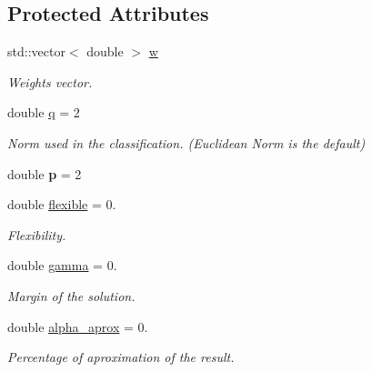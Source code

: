 \subsection*{Protected Attributes}
\begin{DoxyCompactItemize}
\item 
\mbox{\label{class_primal_classifier_ad6ad165a5ad305841797374de9fc2aac}} 
std\+::vector$<$ double $>$ \hyperlink{class_primal_classifier_ad6ad165a5ad305841797374de9fc2aac}{w}
\begin{DoxyCompactList}\small\item\em Weights vector. \end{DoxyCompactList}\item 
\mbox{\label{class_primal_classifier_a746ad2ff93fb77d82ae389f90dbdc89e}} 
double \hyperlink{class_primal_classifier_a746ad2ff93fb77d82ae389f90dbdc89e}{q} = 2
\begin{DoxyCompactList}\small\item\em Norm used in the classification. (Euclidean Norm is the default) \end{DoxyCompactList}\item 
\mbox{\label{class_primal_classifier_abc5cd90a024d5acfe49ae8ea787204c9}} 
double {\bfseries p} = 2
\item 
\mbox{\label{class_primal_classifier_af660bbc42f67792e3da8876671b1e9df}} 
double \hyperlink{class_primal_classifier_af660bbc42f67792e3da8876671b1e9df}{flexible} = 0.
\begin{DoxyCompactList}\small\item\em Flexibility. \end{DoxyCompactList}\item 
\mbox{\label{class_primal_classifier_ab8c6099dda1468385b2c401cb65c1238}} 
double \hyperlink{class_primal_classifier_ab8c6099dda1468385b2c401cb65c1238}{gamma} = 0.
\begin{DoxyCompactList}\small\item\em Margin of the solution. \end{DoxyCompactList}\item 
\mbox{\label{class_primal_classifier_a1a432d06373100e176e116f995bdcd26}} 
double \hyperlink{class_primal_classifier_a1a432d06373100e176e116f995bdcd26}{alpha\+\_\+aprox} = 0.
\begin{DoxyCompactList}\small\item\em Percentage of aproximation of the result. \end{DoxyCompactList}\end{DoxyCompactItemize}


